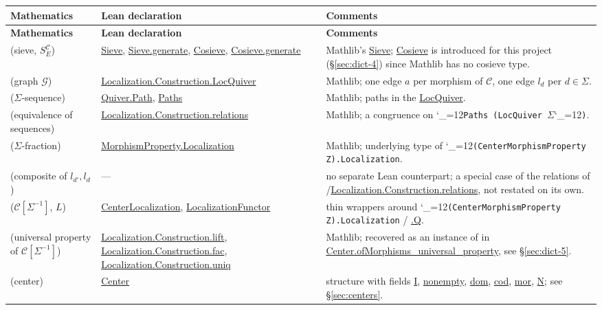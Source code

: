 \documentclass[11pt]{amsart}
\newcommand{\lc}[1]{\url{#1}}
\newcommand{\lcode}{\begingroup\catcode`\_=12\relax\lcodeInner}
\newcommand{\lcodeInner}[1]{\texttt{#1}\endgroup}
\theoremstyle{plain}
\theoremstyle{definition}
\theoremstyle{remark}
\newcommand{\calC}{\mathcal C}
\newcommand{\calG}{\mathcal G}
\begin{document}
\begingroup
\renewcommand{\arraystretch}{1.15}
\begin{longtable}{@{}p{2.55cm}p{4.1cm}p{4.75cm}@{}}
\toprule
\textbf{Mathematics} & \textbf{Lean declaration} & \textbf{Comments} \\
\midrule
\endfirsthead
\toprule
\textbf{Mathematics} & \textbf{Lean declaration} & \textbf{Comments} \\
\midrule
\endhead
\bottomrule
\endfoot
\citep[Definition~2.1]{Mayeux} (sieve, $S^\calC_E$) & \lc{Sieve}, \lc{Sieve.generate}, \lc{Cosieve}, \lc{Cosieve.generate} & Mathlib's \lc{Sieve}; \lc{Cosieve} is introduced for this project (\S\ref{sec:dict-4}) since Mathlib has no cosieve type. \\
\citep[Definition~2.2]{Mayeux} (graph $\calG$) & \lc{Localization.Construction.LocQuiver} & Mathlib; one edge $a$ per morphism of $\calC$, one edge $l_d$ per $d\in\Sigma$. \\
\citep[Definition~2.3]{Mayeux} ($\Sigma$-sequence) & \lc{Quiver.Path}, \lc{Paths} & Mathlib; paths in the \lc{LocQuiver}. \\
\citep[Definition~2.4]{Mayeux} (equivalence of sequences) & \lc{Localization.Construction.relations} & Mathlib; a congruence on \lcode{Paths (LocQuiver }\ensuremath{\Sigma}\lcode{)}. \\
\citep[Definition~2.5]{Mayeux} ($\Sigma$-fraction) & \lc{MorphismProperty.Localization} & Mathlib; underlying type of \lcode{(CenterMorphismProperty Z).Localization}. \\
\citep[Fact~2.6]{Mayeux} (composite of $l_{d'}, l_d$) & --- & no separate Lean counterpart; a special case of the relations of \citep[Definition~2.4]{Mayeux}/\lc{Localization.Construction.relations}, not restated on its own. \\
\citep[Definition~2.7]{Mayeux} ($\calC[\Sigma^{-1}]$, $L$) & \lc{CenterLocalization}, \lc{LocalizationFunctor} & thin wrappers around \lcode{(CenterMorphismProperty Z).Localization} / \lc{.Q}. \\
\citep[Proposition~2.8]{Mayeux} (universal property of $\calC[\Sigma^{-1}]$) & \lc{Localization.Construction.lift}, \lc{Localization.Construction.fac}, \lc{Localization.Construction.uniq} & Mathlib; recovered as an instance of \citep[Theorem~3.10]{Mayeux} in \lc{Center.ofMorphisms_universal_property}, see \S\ref{sec:dict-5}. \\
\citep[Definition~2.9]{Mayeux} (center) & \lc{Center} & structure with fields \lc{I}, \lc{nonempty}, \lc{dom}, \lc{cod}, \lc{mor}, \lc{N}; see \S\ref{sec:centers}. \\

\end{longtable}
\end{document}
